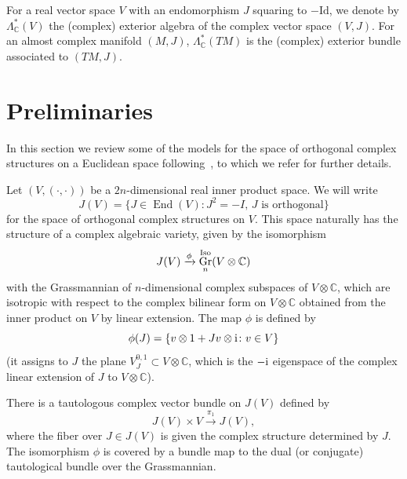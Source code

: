 \documentclass[pdftex]{sigma}%
\newcommand{\C}{\mathbb{C}}
\DeclareMathOperator{\Gr}{Gr}
\DeclareMathOperator{\End}{End}
\numberwithin{equation}{section}
\begin{document}
For a real vector space $V$ with an endomorphism $J$ squaring to $-\mathrm{Id}$, we denote by $\Lambda_\C^*(V)$ the (complex) exterior algebra of the complex vector space $(V,J)$. For an almost complex manifold $(M,J)$, $\Lambda_\C^\ast (TM)$ is the (complex) exterior bundle associated to $(TM,J)$.

\section{Preliminaries}\label{section2}
In this section we review some of the models for the space of orthogonal complex structures on a Euclidean space following~\cite[Section~IV.9]{LM}, to which we refer for further details.

Let $(V, (\cdot, \cdot ))$ be a $2n$-dimensional real inner product space. We will write \[J(V)=\big\{ J \in \End(V) \colon J^2=-I, \, J \text{ is orthogonal} \big\}\]
for the space of orthogonal complex structures on $V$. This space naturally has the structure of a complex algebraic variety, given by the isomorphism
\[ J(V) \xrightarrow{\phi} \Gr_n^{\rm Iso}(V\otimes \C) \]
with the Grassmannian of $n$-dimensional complex subspaces of $V\otimes \C$, which are isotropic with respect to the complex bilinear form on $V\otimes \C$ obtained from the inner product on $V$ by linear extension. The map $\phi$ is defined by
\[ \phi(J) = \{ v\otimes 1 + Jv \otimes {\rm i} \colon v \in V\} \]
(it assigns to $J$ the plane $V_J^{0,1} \subset V\otimes \C$, which is the $-{\rm i}$ eigenspace of the complex linear extension of $J$ to $V\otimes \C$).

There is a tautologous complex vector bundle on $J(V)$ defined by
\[J(V) \times V \xrightarrow{\pi_1} J(V),\]
where the fiber over $J\in J(V)$ is given the complex structure determined by $J$.
The isomorphism $\phi$ is covered by a bundle map to the dual (or conjugate) tautological bundle over the Grassmannian.
\end{document}
